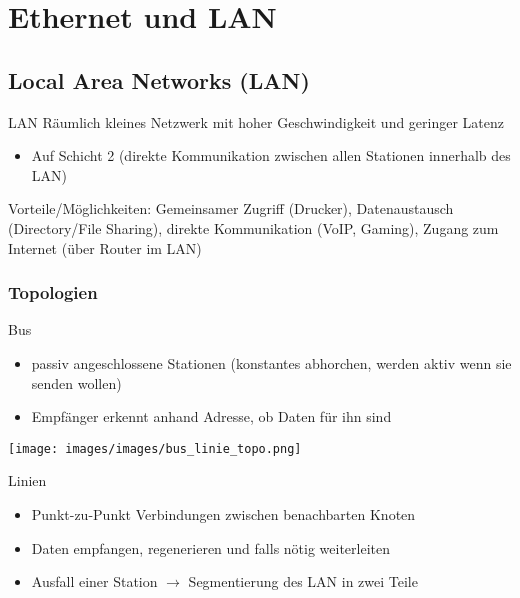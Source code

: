 \section{Ethernet und LAN}
\subsection{Local Area Networks (LAN)}

\begin{definition}{LAN}
    Räumlich kleines Netzwerk mit hoher Geschwindigkeit und geringer Latenz
    \begin{itemize}
        \item Auf Schicht 2 (direkte Kommunikation zwischen allen Stationen innerhalb des LAN)
    \end{itemize}
    Vorteile/Möglichkeiten: Gemeinsamer Zugriff (Drucker), Datenaustausch (Directory/File Sharing), direkte Kommunikation (VoIP, Gaming), Zugang zum Internet (über Router im LAN)
\end{definition}

\subsubsection{Topologien}

\begin{definition}{Bus}
    \begin{itemize}
        \item passiv angeschlossene Stationen (konstantes abhorchen, werden aktiv wenn sie senden wollen)
        \item Empfänger erkennt anhand Adresse, ob Daten für ihn sind
    \end{itemize}
\end{definition}

 
    \centering
    \texttt{[image: images/images/bus\_linie\_topo.png]}
 

\begin{definition}{Linien}
    \begin{itemize}
        \item Punkt-zu-Punkt Verbindungen zwischen benachbarten Knoten
        \item Daten empfangen, regenerieren und falls nötig weiterleiten
        \item Ausfall einer Station $\rightarrow$ Segmentierung des LAN in zwei Teile
    \end{itemize}
\end{definition}

